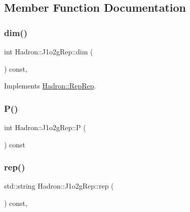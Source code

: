 \subsection{Member Function Documentation}
\mbox{\label{structHadron_1_1J1o2gRep_afbe3a5f8d11261126c36952b2fcac25c}} 
\subsubsection{\texorpdfstring{dim()}{dim()}}
{\footnotesize\ttfamily int Hadron\+::\+J1o2g\+Rep\+::dim (\begin{DoxyParamCaption}{ }\end{DoxyParamCaption}) const\hspace{0.3cm}{\ttfamily [inline]}, {\ttfamily [virtual]}}



Implements \mbox{\hyperlink{structHadron_1_1RepRep_a92c8802e5ed7afd7da43ccfd5b7cd92b}{Hadron\+::\+Rep\+Rep}}.

\mbox{\label{structHadron_1_1J1o2gRep_a23669238b8f2c4ecfbabacf36c40d2b3}} 
\subsubsection{\texorpdfstring{P()}{P()}}
{\footnotesize\ttfamily int Hadron\+::\+J1o2g\+Rep\+::P (\begin{DoxyParamCaption}{ }\end{DoxyParamCaption}) const\hspace{0.3cm}{\ttfamily [inline]}}

\mbox{\label{structHadron_1_1J1o2gRep_a22d769f4159dcc0aff401a4af78dbd37}} 
\subsubsection{\texorpdfstring{rep()}{rep()}}
{\footnotesize\ttfamily std\+::string Hadron\+::\+J1o2g\+Rep\+::rep (\begin{DoxyParamCaption}{ }\end{DoxyParamCaption}) const\hspace{0.3cm}{\ttfamily [inline]}, {\ttfamily [virtual]}}



